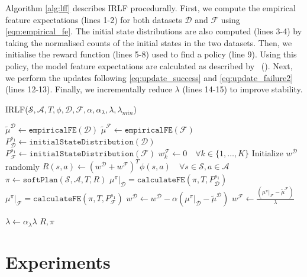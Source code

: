 \documentclass[letterpaper]{article}
\newcommand{\citet}[1]{\citeauthor{#1}~(\citeyear{#1})}
\begin{document}
Algorithm \ref{alg:lff} describes IRLF procedurally. First, we compute the empirical feature expectations (lines 1-2) for both datasets $\mathcal{D}$ and $\mathcal{F}$ using \eqref{eqn:empirical_fe}.	The initial state distributions are also computed (lines 3-4) by taking the normalised counts of the initial states in the two datasets. Then, we initialise the reward function (lines 5-8) used to find a policy (line 9). Using this policy, the model feature expectations are calculated as described by \citet{ziebart2013principle}. Next, we perform the updates following \eqref{eq:update_success} and \eqref{eq:update_failure2} (lines 12-13). Finally, we incrementally reduce $\lambda$ (lines 14-15) to improve stability.

\begin{algorithm}
\caption{IRLF($\mathcal{S},\mathcal{A},T, \phi, \mathcal{D}, \mathcal{F}, \alpha, \alpha_{\lambda}, \lambda, \lambda_{min}$) }
\label{alg:lff}
\begin{algorithmic}[1]
\STATE $\widetilde{\mu}^{\mathcal{D}} \gets \mathtt{empiricalFE}(\mathcal{D})$\hfill {}
\STATE $\widetilde{\mu}^{\mathcal{F}} \gets \mathtt{empiricalFE}(\mathcal{F})$ 
\STATE $P_{\mathcal{D}}^{s_1} \gets \mathtt{initialStateDistribution}(\mathcal{D})$
\STATE $P_{\mathcal{F}}^{s_1} \gets \mathtt{initialStateDistribution}(\mathcal{F})$
\STATE $w^{\mathcal{F}}_k\gets 0\quad\forall k\in\{1,\ldots,K\}$
\STATE Initialize $w^{\mathcal{D}}$ randomly
\REPEAT
\STATE $R(s,a) \gets (w^{\mathcal{D}}+w^{\mathcal{F}})^T\phi(s,a)\quad\forall s\in\mathcal{S},a\in\mathcal{A}$
\STATE $\pi \gets \mathtt{softPlan}(\mathcal{S},\mathcal{A},T,R)$\hfill{}
\STATE $\mu^\pi|_{\mathcal{D}} = \mathtt{calculateFE}(\pi,T,P_{\mathcal{D}}^{s_1})$
\STATE $\mu^\pi|_{\mathcal{F}} = \mathtt{calculateFE}(\pi,T,P_{\mathcal{F}}^{s_1})$
\STATE $w^{\mathcal{D}} \leftarrow w^{\mathcal{D}} - \alpha (\mu^\pi|_{\mathcal{D}} - \widetilde{\mu}^{\mathcal{D}})$
\STATE $w^{\mathcal{F}} \leftarrow \frac{(\mu^\pi|_{\mathcal{F}} - \widetilde{\mu}^{\mathcal{F}})}{\lambda}$

\STATE $\lambda \leftarrow \alpha_{\lambda}\lambda$
\ENDIF
{}
\RETURN $R,\pi$
\end{algorithmic}
\end{algorithm}

\vspace{-5mm}

\section{Experiments}
\end{document}
